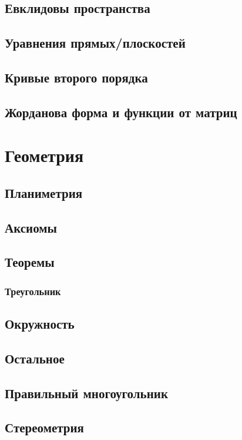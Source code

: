 \subsection{Евклидовы пространства}

\subsection{Уравнения прямых/плоскостей}

\subsection{Кривые второго порядка}

\subsection{Жорданова форма и функции от матриц}


\section{Геометрия}

\subsection{Планиметрия}

\subsection{Аксиомы}

\subsection{Теоремы}

\subsubsection{Треугольник}

\subsection{Окружность}

\subsection{Остальное}

\subsection{Правильный многоугольник}

\subsection{Стереометрия}